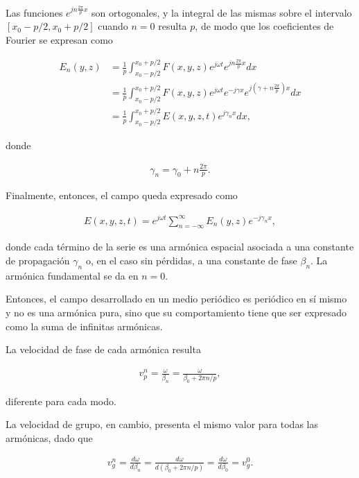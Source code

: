 Las funciones $e^{jn\frac{2\pi}{p}x}$ son ortogonales, y la integral de las mismas sobre el intervalo $[x_0-p/2, x_0+p/2]$ cuando $n = 0$ resulta $p$, de modo que los coeficientes de Fourier se expresan como

\begin{align}
E_n(y,z) &= \frac{1}{p} \int_{x_0-p/2}^{x_0+p/2} F(x,y,z) e^{j\omega t} e^{j n \frac{2\pi}{p} x} dx \\
&= \frac{1}{p} \int_{x_0-p/2}^{x_0+p/2} F(x,y,z) e^{j\omega t} e^{-j\gamma x} e^{j \left(\gamma + n \frac{2\pi}{p}\right) x} dx \\
&= \frac{1}{p} \int_{x_0-p/2}^{x_0+p/2} E(x,y,z,t) e^{j \gamma_n x} dx,
\end{align}

donde

\begin{align}
	\label{eq:relacion_gamma-n-gamma-0}
	\gamma_n = \gamma_0 + n \frac{2\pi}{p}.
\end{align}

Finalmente, entonces, el campo queda expresado como

\begin{align}
E(x,y,z,t) = e^{j\omega t} \sum_{n=-\infty}^{\infty} E_n(y,z) e^{-j\gamma_n x},
\end{align}

donde cada término de la serie es una armónica espacial asociada a una constante de propagación $\gamma_n$ o, en el caso sin pérdidas, a una constante de fase $\beta_n$. La armónica fundamental se da en $n=0$.

Entonces, el campo desarrollado en un medio periódico es periódico en sí mismo y no es una armónica pura, sino que su comportamiento tiene que ser expresado como la suma de infinitas armónicas.

La velocidad de fase de cada armónica resulta %

\begin{align}
v_p^n = \frac{\omega}{\beta_n} = \frac{\omega}{\beta_0 + 2\pi n/p},
\end{align}

diferente para cada modo.

La velocidad de grupo, en cambio, presenta el mismo valor para todas las armónicas, dado que

\begin{align}
v_g^n = \frac{d\omega}{d\beta_n} = \frac{d\omega}{d(\beta_0 +2\pi n/p)} = \frac{d\omega}{d\beta_0} = v_g^0.
\end{align}

